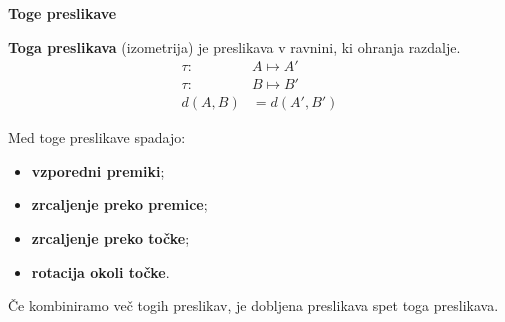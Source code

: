         \begin{frame}
            \large\textbf{Toge preslikave}
            ~\\
            \normalsize

            \begin{alertblock}{}
                \textbf{Toga preslikava} (izometrija) je preslikava v ravnini, ki ohranja razdalje.
                \begin{align*}
                    \tau:~ &A \mapsto A' \\ 
                    \tau:~ &B \mapsto B' \\ 
                    d(A,B)&=d(A',B')
                \end{align*}
            \end{alertblock}

            Med toge preslikave spadajo:
                \begin{itemize}
                    \item \textbf{vzporedni premiki};
                    \item \textbf{zrcaljenje preko premice};
                    \item \textbf{zrcaljenje preko točke};
                    \item \textbf{rotacija okoli točke}.
                \end{itemize}

            Če kombiniramo več togih preslikav, je dobljena preslikava spet toga preslikava.



        \end{frame}

